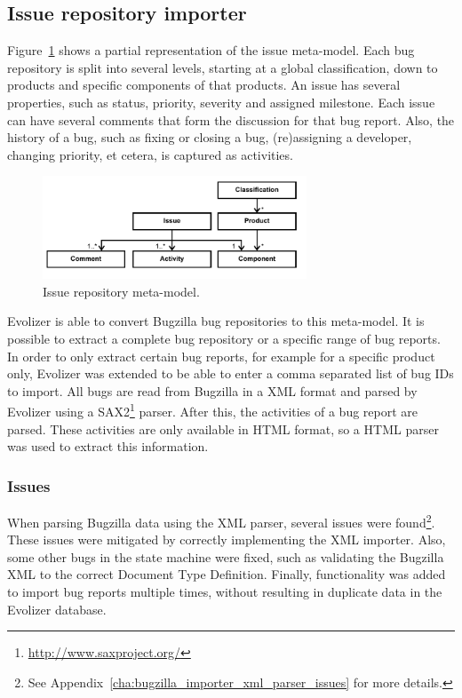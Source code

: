 \subsection{Issue repository importer} %
\label{sub:issue_importer}
Figure~\ref{fig:issue_repo_metamodel} shows a partial representation of the issue meta-model. Each bug repository is split into several levels, starting at a global classification, down to products and specific components of that products. An issue has several properties, such as status, priority, severity and assigned milestone. Each issue can have several comments that form the discussion for that bug report. Also, the history of a bug, such as fixing or closing a bug, (re)assigning a developer, changing priority, et cetera, is captured as activities. 

\begin{figure}[!ht]
	\centering
		\includegraphics[width=0.7\textwidth]{img/issue-model.pdf}
	\caption{Issue repository meta-model.}
	\label{fig:issue_repo_metamodel}
\end{figure}

Evolizer is able to convert Bugzilla bug repositories to this meta-model. It is possible to extract a complete bug repository or a specific range of bug reports. In order to only extract certain bug reports, for example for a specific product only, Evolizer was extended to be able to enter a comma separated list of bug IDs to import. All bugs are read from Bugzilla in a XML format and parsed by Evolizer using a SAX2\footnote{\url{http://www.saxproject.org/}} parser. After this, the activities of a bug report are parsed. These activities are only available in HTML format, so a HTML parser was used to extract this information.

\subsubsection{Issues} %
When parsing Bugzilla data using the XML parser, several issues were found\footnote{See Appendix~\ref{cha:bugzilla_importer_xml_parser_issues} for more details.}. These issues were mitigated by correctly implementing the XML importer. Also, some other bugs in the state machine were fixed, such as validating the Bugzilla XML to the correct Document Type Definition. Finally, functionality was added to import bug reports multiple times, without resulting in duplicate data in the Evolizer database.

